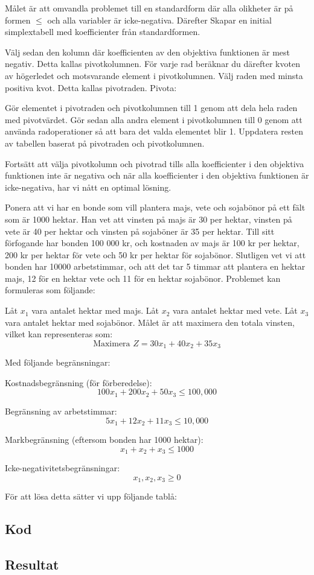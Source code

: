 \documentclass{article}
\begin{document}
Målet är att omvandla problemet till en standardform där alla olikheter är på formen $\leq$ och alla variabler är icke-negativa.
Därefter Skapar en initial simplextabell med koefficienter från standardformen.

Välj sedan den kolumn där koefficienten av den objektiva funktionen är mest negativ. Detta kallas pivotkolumnen. För varje rad beräknar du därefter kvoten av högerledet och motsvarande element i pivotkolumnen. Välj raden med minsta positiva kvot. Detta kallas pivotraden.
Pivota:

Gör elementet i pivotraden och pivotkolumnen till 1 genom att dela hela raden med pivotvärdet. Gör sedan alla andra element i pivotkolumnen till 0 genom att använda radoperationer så att bara det valda elementet blir 1. Uppdatera resten av tabellen baserat på pivotraden och pivotkolumnen.

Fortsätt att välja pivotkolumn och pivotrad tills alla koefficienter i den objektiva funktionen inte är negativa och när alla koefficienter i den objektiva funktionen är icke-negativa, har vi nått en optimal lösning. 

Ponera att vi har en bonde som vill plantera majs, vete och sojabönor på ett fält som är 1000 hektar. Han vet att vinsten på majs är 30 per hektar, vinsten på vete är 40 per hektar och vinsten på sojaböner är 35 per hektar. Till sitt förfogande har bonden 100 000 kr, och kostnaden av majs är 100 kr per hektar, 200 kr per hektar för vete och 50 kr per hektar för sojabönor. Slutligen vet vi att bonden har 10000 arbetstimmar, och att det tar 5 timmar att plantera en hektar majs, 12 för en hektar vete och 11 för en hektar sojabönor. Problemet kan formuleras som följande:

Låt \( x_1 \) vara antalet hektar med majs.
Låt \( x_2 \) vara antalet hektar med vete.
Låt \( x_3 \) vara antalet hektar med sojabönor.
Målet är att maximera den totala vinsten, vilket kan representeras som:
\[
\text{Maximera } Z = 30x_1 + 40x_2 + 35x_3
\]

Med följande begränsningar:

Kostnadsbegränsning (för förberedelse): 
\[ 100x_1 + 200x_2 + 50x_3 \leq 100,000 \]

Begränsning av arbetstimmar: 
\[ 5x_1 + 12x_2 + 11x_3 \leq 10,000 \]

Markbegränsning (eftersom bonden har 1000 hektar): 
\[ x_1 + x_2 + x_3 \leq 1000 \]

Icke-negativitetsbegränsningar: 
\[ x_1, x_2, x_3 \geq 0 \]

För att lösa detta sätter vi upp följande tablå:






\subsection{Kod}

\subsection{Resultat}
\end{document}
